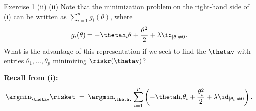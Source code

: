 \documentclass[aspectratio=169]{beamer}
\newcommand{\thetahi}{\thetah_i}
\newcommand{\sumip}{\sum_{i=1}^p}
\begin{document}
\begin{frame}{Exercise 1 (ii)}
	(ii) Note that the minimization problem on the right-hand side of (i) can be written as $\sumip g_i(\theta)$, where
		$$g_i(\theta) = -\thetahi \theta + \frac{\theta^2}{2} + \lambda \id_{|\theta| \neq 0}.$$
		What is the advantage of this representation if we seek to find the $\thetav$ with entries $\theta_1, \ldots, \theta_p$ minimizing $\riskr(\thetav)$?

	\bigskip
	\begin{center}
	{\setlength{\fboxsep}{7pt}\colorbox{black!8}{\parbox{0.92\textwidth}{
		\footnotesize\textbf{Recall from (i):}
		\[
			\argmin_{\thetav} \risket \;=\; \argmin_{\thetav} \sum_{i=1}^p \left( -\thetahi \theta_i + \frac{\theta_i^2}{2} + \lambda \id_{|\theta_i| \neq 0} \right).
		\]
	}}}
	\end{center}
\end{frame}
\end{document}
